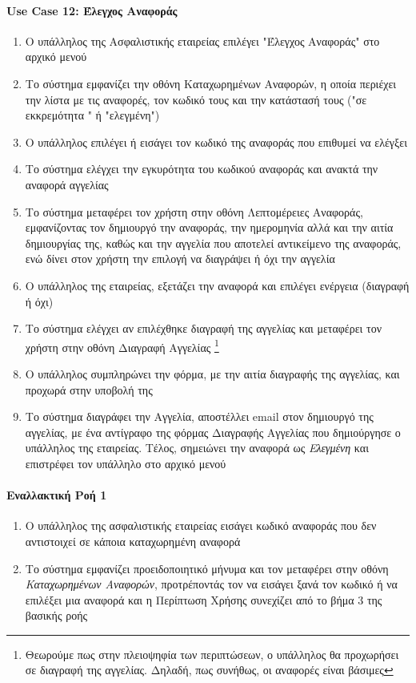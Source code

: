 \documentclass{../ol-softwaremanual}
\begin{document}
	\newpage
	\centering
	
	\paragraph{\en Use Case 12: \gr Έλεγχος Αναφοράς} 
	
	\begin{enumerate}
		\item Ο υπάλληλος της Ασφαλιστικής εταιρείας επιλέγει \en"\gr Έλεγχος Αναφοράς\en" \gr στο αρχικό μενού
		\item Το σύστημα εμφανίζει την οθόνη Καταχωρημένων Αναφορών, η οποία περιέχει την λίστα με τις αναφορές, τον κωδικό τους και την κατάστασή τους (\en"\gr σε εκκρεμότητα \en" \gr ή \en"\gr ελεγμένη\en"\gr)
		\item Ο υπάλληλος επιλέγει ή εισάγει τον κωδικό της αναφοράς που επιθυμεί να ελέγξει 
		\item Το σύστημα ελέγχει την εγκυρότητα του κωδικού αναφοράς και ανακτά την αναφορά αγγελίας
		\item Το σύστημα μεταφέρει τον χρήστη στην οθόνη Λεπτομέρειες Αναφοράς, εμφανίζοντας τον δημιουργό την αναφοράς, την ημερομηνία αλλά και την αιτία δημιουργίας της, καθώς και την αγγελία που αποτελεί αντικείμενο της αναφοράς, ενώ δίνει στον χρήστη την επιλογή να διαγράψει ή όχι την αγγελία
		\item Ο υπάλληλος της εταιρείας, εξετάζει την αναφορά και επιλέγει ενέργεια (διαγραφή ή όχι)
		\item Το σύστημα ελέγχει αν επιλέχθηκε διαγραφή της αγγελίας και μεταφέρει τον χρήστη στην οθόνη Διαγραφή Αγγελίας \footnote[2]{Θεωρούμε πως στην πλειοψηφία των περιπτώσεων, ο υπάλληλος θα προχωρήσει σε διαγραφή της αγγελίας. Δηλαδή, πως συνήθως, οι αναφορές είναι βάσιμες}
		\item Ο υπάλληλος συμπληρώνει την φόρμα, με την αιτία διαγραφής της αγγελίας, και προχωρά στην υποβολή της
		\item Το σύστημα διαγράφει την Αγγελία, αποστέλλει \en email \gr στον δημιουργό της αγγελίας, με ένα αντίγραφο της φόρμας Διαγραφής Αγγελίας που δημιούργησε ο υπάλληλος της εταιρείας. Τέλος, σημειώνει την αναφορά ως \textit{Ελεγμένη} και επιστρέφει τον υπάλληλο στο αρχικό μενού
	\end{enumerate}
	
	\paragraph{Εναλλακτική Ροή 1}
	\begin{enumerate}
		\item Ο υπάλληλος της ασφαλιστικής εταιρείας εισάγει κωδικό αναφοράς που δεν αντιστοιχεί σε κάποια καταχωρημένη αναφορά
		\item Το σύστημα εμφανίζει προειδοποιητικό μήνυμα και τον μεταφέρει στην οθόνη \textit{Καταχωρημένων Αναφορών}, προτρέποντάς τον να εισάγει ξανά τον κωδικό ή να επιλέξει μια αναφορά και η Περίπτωση Χρήσης συνεχίζει από το βήμα 3 της βασικής ροής
	\end{enumerate}	
	
\end{document}

